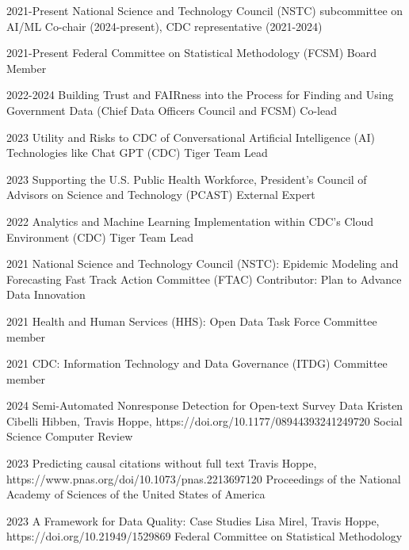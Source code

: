 \documentclass[]{scrartcl}
\begin{document}
\begin{cleanCV}

\WorkExperienceX
{2021-Present}
{National Science and Technology Council (NSTC) subcommittee on AI/ML}
{Co-chair (2024-present), CDC representative (2021-2024)}

\WorkExperienceX
{2021-Present}
{Federal Committee on Statistical Methodology (FCSM)}
{Board Member}

\WorkExperienceX
{2022-2024}
{Building Trust and FAIRness into the Process for Finding and Using Government Data (Chief Data Officers Council and FCSM)}
{Co-lead}

\WorkExperienceX
{2023}
{Utility and Risks to CDC of Conversational Artificial Intelligence (AI) Technologies like Chat GPT (CDC)}
{Tiger Team Lead}

\WorkExperienceX
{2023}
{Supporting the U.S. Public Health Workforce, President's Council of Advisors on Science and Technology (PCAST)}
{External Expert}



\WorkExperienceX
{2022}
{Analytics and Machine Learning Implementation within CDC's Cloud Environment (CDC)}
{Tiger Team Lead}

\WorkExperienceX
{2021}
{National Science and Technology Council (NSTC): Epidemic Modeling and Forecasting Fast Track Action Committee (FTAC)}
{Contributor: Plan to Advance Data Innovation}

\WorkExperienceX
{2021}
{Health and Human Services (HHS): Open Data Task Force}
{Committee member}

\WorkExperienceX
{2021}
{CDC: Information Technology and Data Governance (ITDG)}
{Committee member}



\vspace{0.5em}
\Paper
{2024}
{Semi-Automated Nonresponse Detection for Open-text Survey Data}
{Kristen Cibelli Hibben, Travis Hoppe, \etal}
{https://doi.org/10.1177/08944393241249720}
{Social Science Computer Review}

\Paper
{2023}
{Predicting causal citations without full text}
{Travis Hoppe, \etal}
{https://www.pnas.org/doi/10.1073/pnas.2213697120}
{Proceedings of the National Academy of Sciences of the United States of America}

\Paper
{2023}
{A Framework for Data Quality: Case Studies}
{Lisa Mirel, Travis Hoppe, \etal}
{https://doi.org/10.21949/1529869}
{Federal Committee on Statistical Methodology}


\end{cleanCV}
\end{document}
